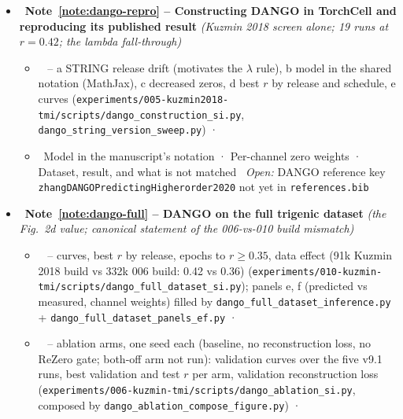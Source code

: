 \begin{itemize}
\begin{itemize}
      \item {}\ Sources · Size, overlap, and structure · Hubs and the two transcription-factor graphs · STRING releases
    \end{itemize}
  \item {}\ \textbf{Note~\ref{note:dango-repro} -- Constructing DANGO in TorchCell and reproducing its published result} \emph{(Kuzmin 2018 screen alone; 19 runs at $r=0.42$; the lambda fall-through)}
    \begin{itemize}\setlength{\itemsep}{0pt}
      \item {}\  -- a STRING release drift (motivates the $\lambda$ rule), b model in the shared notation (MathJax), c decreased zeros, d best $r$ by release and schedule, e curves (\texttt{experiments/005-kuzmin2018-tmi/scripts/dango\_construction\_si.py}, \texttt{dango\_string\_version\_sweep.py}) · 
      \item {}\ Model in the manuscript's notation · Per-channel zero weights · Dataset, result, and what is not matched \quad {}\ \emph{Open:} DANGO reference key \texttt{zhangDANGOPredictingHigherorder2020} not yet in \texttt{references.bib}
    \end{itemize}
  \item {}\ \textbf{Note~\ref{note:dango-full} -- DANGO on the full trigenic dataset} \emph{(the Fig.~2d value; canonical statement of the 006-vs-010 build mismatch)}
    \begin{itemize}\setlength{\itemsep}{0pt}
      \item {}\  -- curves, best $r$ by release, epochs to $r\ge0.35$, data effect (91k Kuzmin 2018 build vs 332k 006 build: 0.42 vs 0.36) (\texttt{experiments/010-kuzmin-tmi/scripts/dango\_full\_dataset\_si.py}); panels e, f (predicted vs measured, channel weights) filled by \texttt{dango\_full\_dataset\_inference.py} + \texttt{dango\_full\_dataset\_panels\_ef.py} · 
      \item {}\  -- ablation arms, one seed each (baseline, no reconstruction loss, no ReZero gate; both-off arm not run): validation curves over the five v9.1 runs, best validation and test $r$ per arm, validation reconstruction loss (\texttt{experiments/006-kuzmin-tmi/scripts/dango\_ablation\_si.py}, composed by \texttt{dango\_ablation\_compose\_figure.py}) · 

\end{itemize}
\end{itemize}
